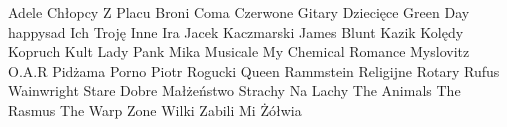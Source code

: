\documentclass{article}
\begin{document}
{ Adele   \newline
 Chłopcy Z Placu Broni   \newline
 Coma   \newline
 Czerwone Gitary   \newline
 Dziecięce   \newline
 Green Day   \newline
 happysad   \newline
 Ich Troję   \newline
 Inne   \newline
 Ira   \newline
 Jacek Kaczmarski   \newline
 James Blunt   \newline
 Kazik   \newline
 Kolędy   \newline
 Kopruch   \newline
 Kult   \newline
 Lady Pank   \newline
 Mika   \newline
 Musicale   \newline
 My Chemical Romance   \newline
 Myslovitz   \newline
 O.A.R   \newline
 Pidżama Porno   \newline
 Piotr Rogucki   \newline
 Queen   \newline
 Rammstein   \newline
 Religijne   \newline
 Rotary   \newline
 Rufus Wainwright   \newline
 Stare Dobre Małżeństwo   \newline
 Strachy Na Lachy   \newline
 The Animals   \newline
 The Rasmus   \newline
 The Warp Zone   \newline
 Wilki   \newline
 Zabili Mi Żółwia   \newline

 }


 
\end{document}
